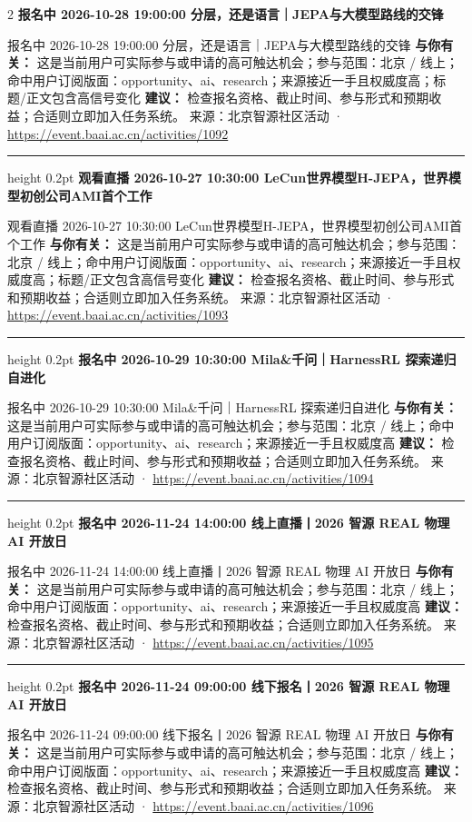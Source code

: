 \documentclass[10.5pt]{ctexart}
\begin{document}
\begin{multicols}{2}
{\large\bfseries 报名中 2026-10-28 19:00:00 分层，还是语言｜JEPA与大模型路线的交锋}\par
报名中 2026-10-28 19:00:00 分层，还是语言｜JEPA与大模型路线的交锋
\textbf{与你有关：} 这是当前用户可实际参与或申请的高可触达机会；参与范围：北京 / 线上；命中用户订阅版面：opportunity、ai、research；来源接近一手且权威度高；标题/正文包含高信号变化
\textbf{建议：} 检查报名资格、截止时间、参与形式和预期收益；合适则立即加入任务系统。
{\footnotesize\color{ormuted} 来源：北京智源社区活动 · \url{https://event.baai.ac.cn/activities/1092}}
\vspace{2mm}
\hrule height 0.2pt
\vspace{2mm}
{\large\bfseries 观看直播 2026-10-27 10:30:00 LeCun世界模型H-JEPA，世界模型初创公司AMI首个工作}\par
观看直播 2026-10-27 10:30:00 LeCun世界模型H-JEPA，世界模型初创公司AMI首个工作
\textbf{与你有关：} 这是当前用户可实际参与或申请的高可触达机会；参与范围：北京 / 线上；命中用户订阅版面：opportunity、ai、research；来源接近一手且权威度高；标题/正文包含高信号变化
\textbf{建议：} 检查报名资格、截止时间、参与形式和预期收益；合适则立即加入任务系统。
{\footnotesize\color{ormuted} 来源：北京智源社区活动 · \url{https://event.baai.ac.cn/activities/1093}}
\vspace{2mm}
\hrule height 0.2pt
\vspace{2mm}
{\large\bfseries 报名中 2026-10-29 10:30:00 Mila\&千问｜HarnessRL 探索递归自进化}\par
报名中 2026-10-29 10:30:00 Mila\&千问｜HarnessRL 探索递归自进化
\textbf{与你有关：} 这是当前用户可实际参与或申请的高可触达机会；参与范围：北京 / 线上；命中用户订阅版面：opportunity、ai、research；来源接近一手且权威度高
\textbf{建议：} 检查报名资格、截止时间、参与形式和预期收益；合适则立即加入任务系统。
{\footnotesize\color{ormuted} 来源：北京智源社区活动 · \url{https://event.baai.ac.cn/activities/1094}}
\vspace{2mm}
\hrule height 0.2pt
\vspace{2mm}
{\large\bfseries 报名中 2026-11-24 14:00:00 线上直播丨2026 智源 REAL 物理 AI 开放日}\par
报名中 2026-11-24 14:00:00 线上直播丨2026 智源 REAL 物理 AI 开放日
\textbf{与你有关：} 这是当前用户可实际参与或申请的高可触达机会；参与范围：北京 / 线上；命中用户订阅版面：opportunity、ai、research；来源接近一手且权威度高
\textbf{建议：} 检查报名资格、截止时间、参与形式和预期收益；合适则立即加入任务系统。
{\footnotesize\color{ormuted} 来源：北京智源社区活动 · \url{https://event.baai.ac.cn/activities/1095}}
\vspace{2mm}
\hrule height 0.2pt
\vspace{2mm}
{\large\bfseries 报名中 2026-11-24 09:00:00 线下报名丨2026 智源 REAL 物理 AI 开放日}\par
报名中 2026-11-24 09:00:00 线下报名丨2026 智源 REAL 物理 AI 开放日
\textbf{与你有关：} 这是当前用户可实际参与或申请的高可触达机会；参与范围：北京 / 线上；命中用户订阅版面：opportunity、ai、research；来源接近一手且权威度高
\textbf{建议：} 检查报名资格、截止时间、参与形式和预期收益；合适则立即加入任务系统。
{\footnotesize\color{ormuted} 来源：北京智源社区活动 · \url{https://event.baai.ac.cn/activities/1096}}
\end{multicols}
\end{document}
